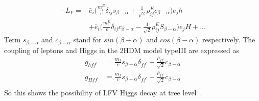 \begin{equation}
\begin{aligned}
-L_{Y}=&\bar{e}_{i}\big(\frac{m^{E}_{i}}{v}\delta_{ij}s_{\beta-\alpha}+\frac{1}{\sqrt{2}}\rho^{E}_{ij}c_{\beta-\alpha}\big)e_{j}h\\
            &+\bar{e}_{i}\big(\frac{m^{E}_{i}}{v}\delta_{ij}c_{\beta-\alpha}-\frac{1}{\sqrt{2}}\rho^{E}_{ij}S_{\beta-\alpha}\big)e_{j}H+...
\end{aligned}
\end{equation}
Term $s_{\beta-\alpha}$ and $c_{\beta-\alpha}$ stand for $sin(\beta-\alpha)$ and $cos(\beta-\alpha)$ respectively. The coupling of leptons and Higgs in the 2HDM model typeIII are expressed as
\begin{equation}
\begin{aligned}
g_{hff^{'}}&=\frac{m_{f}}{v}s_{\beta-\alpha}\delta_{ff^{'}}+\frac{\rho_{ff^{'}}}{\sqrt{2}}c_{\beta-\alpha}\\
g_{Hff^{'}}&=\frac{m_{f}}{v}s_{\beta-\alpha}\delta_{ff^{'}}-\frac{\rho_{ff^{'}}}{\sqrt{2}}c_{\beta-\alpha}\\
\end{aligned}
\end{equation}
So this shows the possibility of LFV Higgs decay at tree level~\cite{PhysRevD.90.115004}.








